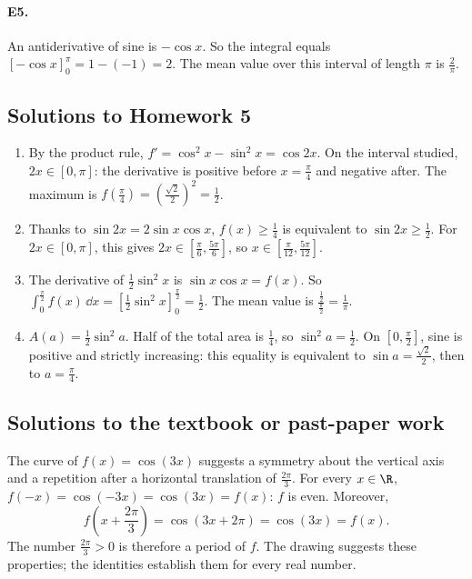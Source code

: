 \paragraph{E5.}An antiderivative of sine is $-\cos x$. So the integral equals $[-\cos x]_0^\pi=1-(-1)=2$. The mean value over this interval of length $\pi$ is $\frac{2}{\pi}$.

\subsection{Solutions to Homework 5}\begin{enumerate}
\item By the product rule, $f'=\cos^2x-\sin^2x=\cos2x$. On the interval studied, $2x\in[0,\pi]$: the derivative is positive before $x=\frac{\pi}{4}$ and negative after. The maximum is $f(\frac{\pi}{4})=(\frac{\sqrt{2}}{2})^2=\frac{1}{2}$.
\item Thanks to $\sin2x=2\sin x\cos x$, $f(x)\ge\frac{1}{4}$ is equivalent to $\sin 2x\ge\frac{1}{2}$. For $2x\in[0,\pi]$, this gives $2x\in[\frac{\pi}{6},\frac{5\pi}{6}]$, so $x\in[\frac{\pi}{12},\frac{5\pi}{12}]$.
\item The derivative of $\frac12\sin^2x$ is $\sin x\cos x=f(x)$. So $\int_0^{\frac{\pi}{2}}f(x)\,\dd x=[\frac12\sin^2x]_0^{\frac{\pi}{2}}=\frac{1}{2}$. The mean value is $\frac{\frac{1}{2}}{\frac{\pi}{2}}=\frac{1}{\pi}$.
\item $A(a)=\frac12\sin^2a$. Half of the total area is $\frac{1}{4}$, so $\sin^2a=\frac{1}{2}$. On $[0,\frac{\pi}{2}]$, sine is positive and strictly increasing: this equality is equivalent to $\sin a=\frac{\sqrt{2}}{2}$, then to $a=\frac{\pi}{4}$.
\end{enumerate}

\subsection{Solutions to the textbook or past-paper work}The curve of $f(x)=\cos(3x)$ suggests a symmetry about the vertical axis and a repetition after a horizontal translation of $\frac{2\pi}3$. For every $x\in\R$, $f(-x)=\cos(-3x)=\cos(3x)=f(x)$: $f$ is even. Moreover,
\[f\left(x+\frac{2\pi}3\right)=\cos(3x+2\pi)=\cos(3x)=f(x).\]
The number $\frac{2\pi}3>0$ is therefore a period of $f$. The drawing suggests these properties; the identities establish them for every real number.

\fi

\backmatter
